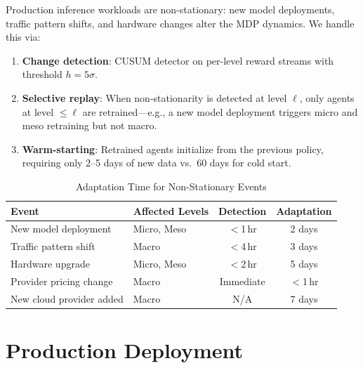 \documentclass[conference,10pt]{IEEEtran}
\begin{document}
Production inference workloads are non-stationary: new model deployments, traffic pattern shifts, and hardware changes alter the MDP dynamics. We handle this via:

\begin{enumerate}
\item \textbf{Change detection}: CUSUM detector on per-level reward streams with threshold $h = 5\sigma$.
\item \textbf{Selective replay}: When non-stationarity is detected at level $\ell$, only agents at level $\leq \ell$ are retrained---e.g., a new model deployment triggers micro and meso retraining but not macro.
\item \textbf{Warm-starting}: Retrained agents initialize from the previous policy, requiring only 2--5 days of new data vs.\ 60 days for cold start.
\end{enumerate}

\begin{table}[!htbp]
\caption{Adaptation Time for Non-Stationary Events}
\label{tab:adapt}
\centering\scriptsize
\begin{tabular}{@{}llcc@{}}
\toprule
\textbf{Event} & \textbf{Affected Levels} & \textbf{Detection} & \textbf{Adaptation} \\
\midrule
New model deployment & Micro, Meso & $<$1\,hr & 2 days \\
Traffic pattern shift & Macro & $<$4\,hr & 3 days \\
Hardware upgrade & Micro, Meso & $<$2\,hr & 5 days \\
Provider pricing change & Macro & Immediate & $<$1\,hr \\
New cloud provider added & Macro & N/A & 7 days \\
\bottomrule
\end{tabular}
\end{table}

\section{Production Deployment}
\label{sec:deploy}
\end{document}
